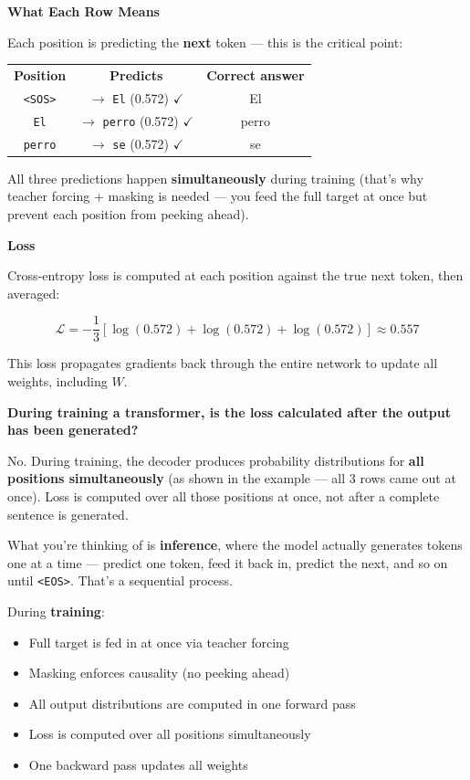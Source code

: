 \medskip
\noindent\textbf{What Each Row Means}

Each position is predicting the \textbf{next} token --- this is the critical point:

\begin{center}
\begin{tabular}{c|c|c}
\textbf{Position} & \textbf{Predicts} & \textbf{Correct answer} \\
\texttt{<SOS>} & $\to$ \texttt{El} (0.572) $\checkmark$ & El \\
\texttt{El}    & $\to$ \texttt{perro} (0.572) $\checkmark$ & perro \\
\texttt{perro} & $\to$ \texttt{se} (0.572) $\checkmark$ & se \\
\end{tabular}
\end{center}

All three predictions happen \textbf{simultaneously} during training (that's why teacher forcing + masking is needed --- you feed the full target at once but prevent each position from peeking ahead).

\medskip
\noindent\textbf{Loss}

Cross-entropy loss is computed at each position against the true next token, then averaged:

\[
\mathcal{L} = -\frac{1}{3}\left[\log(0.572) + \log(0.572) + \log(0.572)\right] \approx 0.557
\]

This loss propagates gradients back through the entire network to update all weights, including $W$.

\bigskip

\textbf{During training a transformer, is the loss calculated after the output has been generated?}

No. During training, the decoder produces probability distributions for \textbf{all positions simultaneously} (as shown in the example --- all 3 rows came out at once). Loss is computed over all those positions at once, not after a complete sentence is generated.

What you're thinking of is \textbf{inference}, where the model actually generates tokens one at a time --- predict one token, feed it back in, predict the next, and so on until \texttt{<EOS>}. That's a sequential process.

During \textbf{training}:
\begin{itemize}
\item Full target is fed in at once via teacher forcing
\item Masking enforces causality (no peeking ahead)
\item All output distributions are computed in one forward pass
\item Loss is computed over all positions simultaneously
\item One backward pass updates all weights
\end{itemize}

